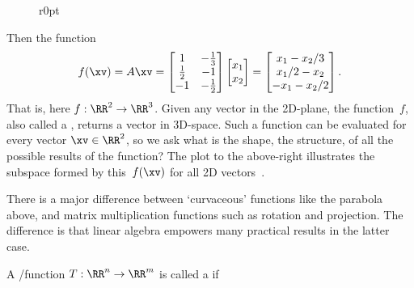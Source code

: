 \begin{figure}[7]r{0pt}
\end{figure}
Then the function
\begin{equation*}
f(\xv)=A\xv
=\begin{bmatrix} 1&-\frac13\\\frac12&-1\\-1&-\frac12 \end{bmatrix}\begin{bmatrix} x_1\\x_2 \end{bmatrix}
=\begin{bmatrix} x_1-x_2/3\\x_1/2-x_2\\-x_1-x_2/2 \end{bmatrix}.
\end{equation*}
That is, here \(f:\RR^2\to\RR^3\).  
Given any vector in the 2D-plane, the function~\(f\), also called a , returns a vector in 3D-space.  
Such a function can be evaluated for every vector \(\xv\in\RR^2\), so we ask what is the shape, the structure, of all the possible results of the function?
The plot to the above-right illustrates the subspace formed by this~\(f(\xv)\) for all 2D vectors~\xv.


There is a major difference between `curvaceous' functions like the parabola above, and matrix multiplication functions such as rotation and projection.
The difference is that linear algebra empowers many practical results in the latter case.



\begin{definition} \label{def:lintran} 
A \slash function \(T:\RR^n\to\RR^m\) is called a  if
\end{definition}


